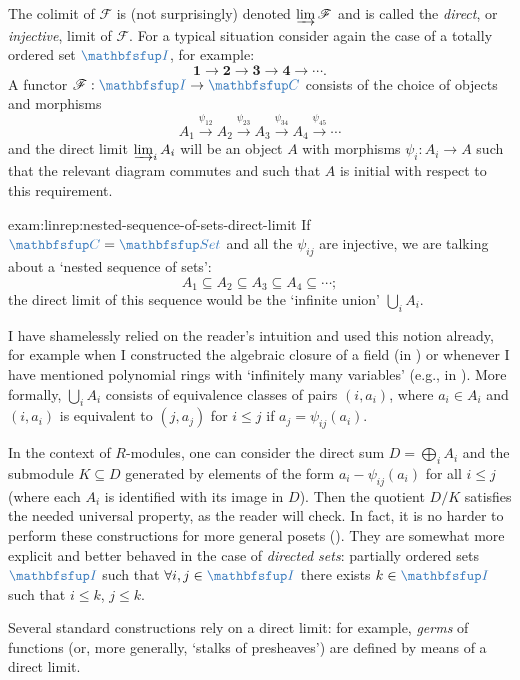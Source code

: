 The colimit of $\mathscr{F}$ is (not surprisingly) denoted
$\varinjlim \mathscr{F}$ and is called the \emph{direct}, or
\emph{injective}, limit of $\mathscr{F}$. For a typical situation
consider again the case of a totally ordered set $\categ{I}$, for
example:
\[
  \mathbf{1} \to \mathbf{2} \to \mathbf{3} \to \mathbf{4} \to \cdots.
\]
A functor $\mathscr{F} : \categ{I} \to \categ{C}$ consists of the
choice of objects and morphisms
\[
  A_1 \xrightarrow{\psi_{12}} A_2 \xrightarrow{\psi_{23}} A_3
  \xrightarrow{\psi_{34}} A_4 \xrightarrow{\psi_{45}} \cdots
\]
and the direct limit $\varinjlim_i A_i$ will be an object $A$ with
morphisms $\psi_i : A_i \to A$ such that the relevant diagram commutes
and such that $A$ is initial with respect to this requirement.
\begin{exam}{}{exam:linrep:nested-sequence-of-sets-direct-limit}
  If $\categ{C} = \categ{Set}$ and all the $\psi_{ij}$ are injective,
  we are talking about a `nested sequence of sets':
  \[
    A_1 \subseteq A_2 \subseteq A_3 \subseteq A_4 \subseteq \cdots;
  \]
  the direct limit of this sequence would be the `infinite union'
  $\bigcup_i A_i$.
\end{exam}
I have shamelessly relied on the reader's intuition and used this
notion already, for example when I constructed the algebraic closure
of a field (in ) or whenever
I have mentioned polynomial rings with `infinitely many variables'
(e.g., in ). More formally,
$\bigcup_i A_i$ consists of equivalence classes of pairs $(i, a_i)$,
where $a_i \in A_i$ and $(i, a_i)$ is equivalent to $(j, a_j)$ for
$i \leq j$ if $a_j = \psi_{ij}(a_i)$.

In the context of $R$-modules, one can consider the direct sum
$D = \bigoplus_i A_i$ and the submodule $K \subseteq D$ generated by
elements of the form $a_i - \psi_{ij}(a_i)$ for all $i \leq j$ (where
each $A_i$ is identified with its image in $D$). Then the quotient
$D/K$ satisfies the needed universal property, as the reader will
check. In fact, it is no harder to perform these constructions for
more general posets
(). They are
somewhat more explicit and better behaved in the case of
\emph{directed sets}: partially ordered sets $\categ{I}$ such that
$\forall i, j \in \categ{I}$ there exists $k \in \categ{I}$ such that
$i \leq k$, $j \leq k$.

Several standard constructions rely on a direct limit: for example,
\emph{germs} of functions (or, more generally, `stalks of presheaves')
are defined by means of a direct limit.

